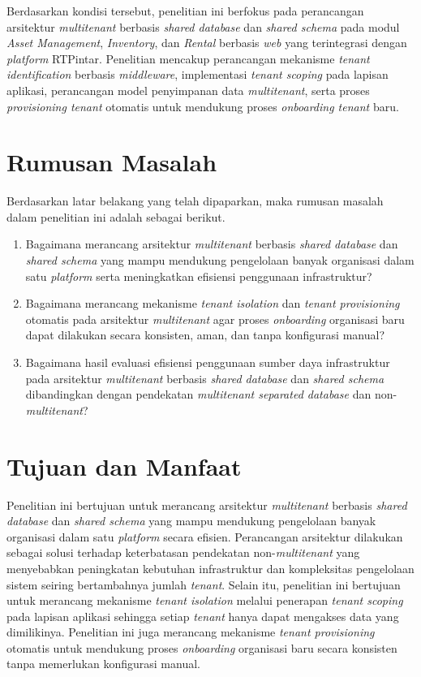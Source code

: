 Berdasarkan kondisi tersebut, penelitian ini berfokus pada perancangan arsitektur
\textit{multitenant} berbasis \textit{shared database} dan \textit{shared schema} pada modul
\textit{Asset Management}, \textit{Inventory}, dan \textit{Rental} berbasis \textit{web} yang
terintegrasi dengan \textit{platform} RTPintar. Penelitian mencakup perancangan mekanisme
\textit{tenant identification} berbasis \textit{middleware}, implementasi \textit{tenant scoping}
pada lapisan aplikasi, perancangan model penyimpanan data \textit{multitenant}, serta proses
\textit{provisioning tenant} otomatis untuk mendukung proses \textit{onboarding tenant} baru.

\section{Rumusan Masalah}

Berdasarkan latar belakang yang telah dipaparkan, maka rumusan masalah dalam penelitian ini
adalah sebagai berikut.

\begin{enumerate}
  \item Bagaimana merancang arsitektur \textit{multitenant} berbasis \textit{shared database} dan
    \textit{shared schema} yang mampu mendukung pengelolaan banyak organisasi dalam satu \textit{platform}
    serta meningkatkan efisiensi penggunaan infrastruktur?
  \item Bagaimana merancang mekanisme \textit{tenant isolation} dan \textit{tenant provisioning} otomatis
    pada arsitektur \textit{multitenant} agar proses \textit{onboarding} organisasi baru dapat dilakukan
    secara konsisten, aman, dan tanpa konfigurasi manual?
  \item Bagaimana hasil evaluasi efisiensi penggunaan sumber daya infrastruktur pada arsitektur
    \textit{multitenant} berbasis \textit{shared database} dan \textit{shared schema} dibandingkan dengan
    pendekatan \textit{multitenant separated database} dan non-\textit{multitenant}?
\end{enumerate}

\section{Tujuan dan Manfaat}

Penelitian ini bertujuan untuk merancang arsitektur \textit{multitenant} berbasis \textit{shared database} dan \textit{shared schema} yang mampu mendukung pengelolaan banyak organisasi dalam satu \textit{platform} secara efisien. Perancangan arsitektur dilakukan sebagai solusi terhadap keterbatasan pendekatan non-\textit{multitenant} yang menyebabkan peningkatan kebutuhan infrastruktur dan kompleksitas pengelolaan sistem seiring bertambahnya jumlah \textit{tenant}. Selain itu, penelitian ini bertujuan untuk merancang mekanisme \textit{tenant isolation} melalui penerapan \textit{tenant scoping} pada lapisan aplikasi sehingga setiap \textit{tenant} hanya dapat mengakses data yang dimilikinya. Penelitian ini juga merancang mekanisme \textit{tenant provisioning} otomatis untuk mendukung proses \textit{onboarding} organisasi baru secara konsisten tanpa memerlukan konfigurasi manual.

